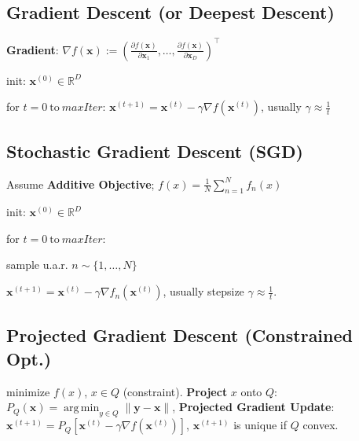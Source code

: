 \documentclass[a4paper, 11pt, landscape]{article}
\DeclareMathOperator*{\argmin}{arg\,min}
\begin{document}
\begin{multicols*}{3}
\subsection{Gradient Descent (or Deepest Descent)}
\textbf{Gradient}: $\nabla f(\mathbf{x}) := \left( \frac{\partial f(\mathbf{x})}{\partial \mathbf{x}_1}, \ldots, \frac{\partial f(\mathbf{x})}{\partial \mathbf{x}_D} \right)^\top$
\begin{inparaenum}
	\item init: $\mathbf{x}^{(0)} \in \mathbb{R}^D$
	\item for $t = 0 \ \text{to} \ \mathit{maxIter}$: $\mathbf{x}^{(t+1)} = \mathbf{x}^{(t)} - \gamma \nabla f(\mathbf{x}^{(t)})$, usually $\gamma \approx \frac{1}{t}$
\end{inparaenum}

\subsection{Stochastic Gradient Descent (SGD)}
Assume \textbf{Additive Objective}; $f(x) = \frac{1}{N}\sum_{n=1}^{N}f_n(x)$
\begin{inparaenum}
	\item init: $\mathbf{x}^{(0)} \in \mathbb{R}^D$
	\item for $t = 0 \ \text{to} \ \mathit{maxIter}$:
	\item sample u.a.r. $n \sim \{1, \ldots, N\}$
	\item $\mathbf{x}^{(t+1)} = \mathbf{x}^{(t)} - \gamma \nabla f_n(\mathbf{x}^{(t)})$, usually stepsize $\gamma \approx \frac{1}{t}$. 
\end{inparaenum}

\subsection{Projected Gradient Descent (Constrained Opt.)}
minimize $f(x)$, $x \in Q$ (constraint).
\textbf{Project} $x$ onto $Q$: $P_Q(\mathbf{x}) = \argmin_{y \in Q} \|\mathbf{y} - \mathbf{x}\|$,
\textbf{Projected Gradient Update}: $\mathbf{x}^{(t+1)} = P_Q[\mathbf{x}^{(t)} - \gamma \nabla f(\mathbf{x}^{(t)})]$,
$\mathbf{x}^{(t+1)}$ is unique if $Q$ convex.


\end{multicols*}
\end{document}
